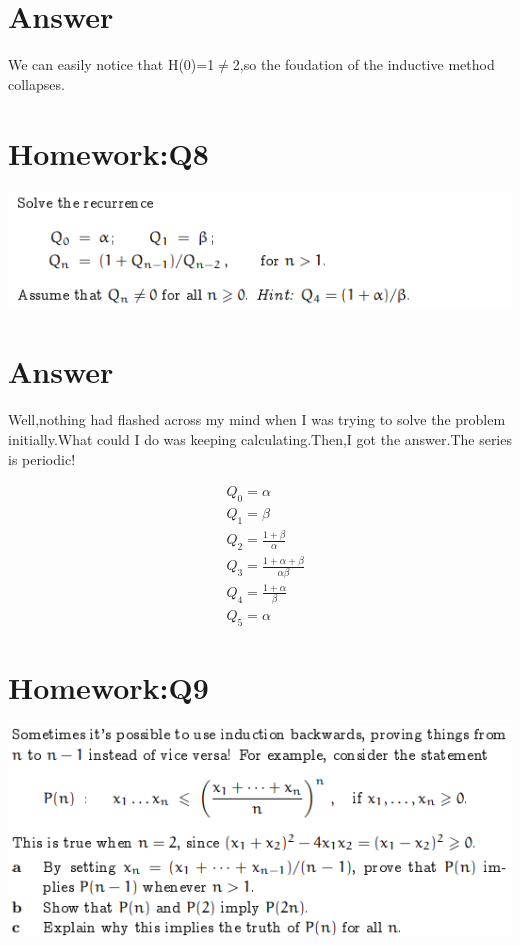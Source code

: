 \documentclass[a4paper]{article}
\begin{document}
\section*{Answer}
We can easily notice that H(0)=1$\neq$2,so the foudation of the inductive method collapses.

\section*{Homework:Q8}
\includegraphics[scale=1.2]{Q8.png}
\section*{Answer}
Well,nothing had flashed across my mind when I was trying to solve the problem initially.What could I do was keeping calculating.Then,I got the answer.The series is periodic!\par 
\begin{align}
	&Q_{0}=\alpha \\
	&Q_{1}=\beta \\
	&Q_{2}=\frac{1+\beta}{\alpha} \\
	&Q_{3}=\frac{1+\alpha+\beta}{\alpha\beta} \\
	&Q_{4}=\frac{1+\alpha}{\beta} \\
	&Q_{5}=\alpha 
\end{align}


\section*{Homework:Q9}
\includegraphics[scale=1.2]{Q9.png}
\end{document}
